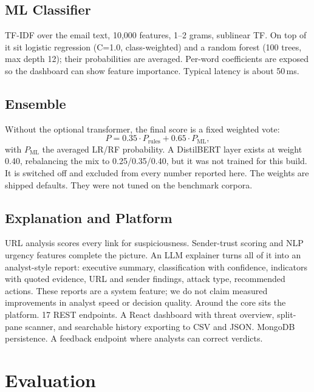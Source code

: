 \documentclass[conference]{IEEEtran}
\begin{document}
\subsection{ML Classifier}
TF-IDF over the email text, 10,000 features, 1--2 grams, sublinear TF. On top
of it sit logistic regression (C=1.0, class-weighted) and a random forest
(100 trees, max depth 12); their probabilities are averaged. Per-word
coefficients are exposed so the dashboard can show feature importance.
Typical latency is about 50\,ms.

\subsection{Ensemble}
Without the optional transformer, the final score is a fixed weighted vote:
\begin{equation}
P = 0.35 \cdot P_{\text{rules}} + 0.65 \cdot P_{\text{ML}},
\label{eq:ensemble}
\end{equation}
with $P_{\text{ML}}$ the averaged LR/RF probability. A DistilBERT layer
exists at weight 0.40, rebalancing the mix to 0.25/0.35/0.40, but it was not
trained for this build. It is switched off and excluded from every number
reported here. The weights are shipped defaults. They were not tuned on the
benchmark corpora.

\subsection{Explanation and Platform}
URL analysis scores every link for suspiciousness. Sender-trust scoring and
NLP urgency features complete the picture. An LLM explainer turns all of it
into an analyst-style report: executive summary, classification with
confidence, indicators with quoted evidence, URL and sender findings, attack
type, recommended actions. These reports are a system feature; we do not
claim measured improvements in analyst speed or decision quality. Around the
core sits the platform. 17 REST endpoints. A React dashboard with threat
overview, split-pane scanner, and searchable history exporting to CSV and
JSON. MongoDB persistence. A feedback endpoint where analysts can correct
verdicts.

\section{Evaluation}
\end{document}
